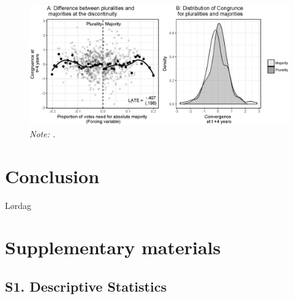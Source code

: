 \documentclass[a4paper,12pt]{article}
\newcommand\fnote[1]{\captionsetup{font=small}\caption*{#1}}
\newcommand{\beginsupplement}{%
	\setcounter{table}{0}
	\renewcommand{\thetable}{S.\arabic{table}}%
	\setcounter{figure}{0}
	\renewcommand{\thefigure}{S.\arabic{figure}}%
}
\begin{document}
\begin{landscape}
	\begin{figure}[h]
		\centering
		\includegraphics[scale = 1]{rddCongruence.eps}
		\caption{\textbf{.}} \fnote{\emph{Note: .}}
		\label{fig:PermTest}
	\end{figure}
\end{landscape}
	
\section{Conclusion}

Lørdag





\beginsupplement

\section{Supplementary materials}

\subsection{S1. Descriptive Statistics}

	
\end{document}
